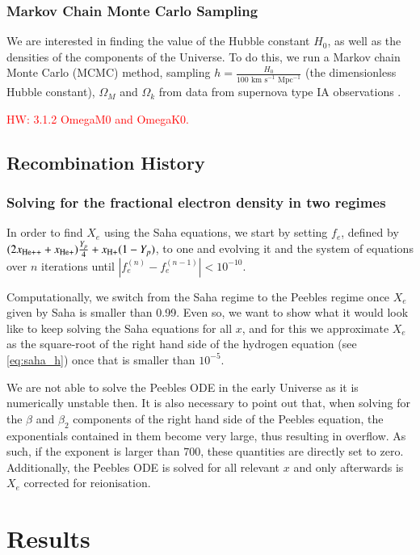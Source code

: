 \documentclass{aa}
\newcommand{\hw}[1]{\textcolor{red}{HW: #1}}
\begin{document}
\subsubsection{Markov Chain Monte Carlo Sampling}

We are interested in finding the value of the Hubble constant $H_0$, as well as the densities of the components of the Universe. To do this, we run a Markov chain Monte Carlo (MCMC) method, sampling $h = \frac{H_0}{100\text{ km s}^{-1}\text{ Mpc}^{-1}}$ (the dimensionless Hubble constant), $\Omega_M$ and $\Omega_k$ from data from supernova type IA observations \citep{Betoule_2014}.

\hw{3.1.2 OmegaM0 and OmegaK0.}

\subsection{Recombination History}

\subsubsection{Solving for the fractional electron density in two regimes}

In order to find $X_e$ using the Saha equations, we start by setting $f_e$, defined by $(2x_{\rm He++} + x_{\rm He+})\frac{Y_p}{4} + x_{\rm H+}(1-Y_p)$, to one and evolving it and the system of equations over $n$ iterations until $|f_e^{(n)} - f_e^{(n-1)}| < 10^{-10}$.

Computationally, we switch from the Saha regime to the Peebles regime once $X_e$ given by Saha is smaller than 0.99. Even so, we want to show what it would look like to keep solving the Saha equations for all $x$, and for this we approximate $X_e$ as the square-root of the right hand side of the hydrogen equation (see \eqref{eq:saha_h}) once that is smaller than $10^{-5}$.

We are not able to solve the Peebles ODE in the early Universe as it is numerically unstable then. It is also necessary to point out that, when solving for the $\beta$ and $\beta_2$ components of the right hand side of the Peebles equation, the exponentials contained in them become very large, thus resulting in overflow. As such, if the exponent is larger than 700, these quantities are directly set to zero. Additionally, the Peebles ODE is solved for all relevant $x$ and only afterwards is $X_e$ corrected for reionisation.

\section{Results}
\end{document}
